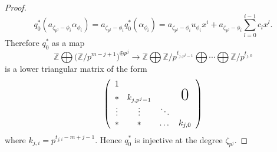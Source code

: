 \documentclass[a4paper,leqno,11pt]{amsart}
\theoremstyle{plain}
\theoremstyle{definition}
\theoremstyle{remark}
\theoremstyle{definition}
\newcommand{\Z}{{\mathbb{Z}}}
\def\Z{\mathbb{Z}}
\def\a{\alpha}
\numberwithin{equation}{section}
\begin{document}
\begin{proof}
		$$q_{0}^{*}(a_{\zeta_{p^j}-\phi_{i}}\a_{\phi_{i}})= a_{\zeta_{p^j}-\phi_{i}}q_{0}^{*}(\a_{\phi_{i}}) = a_{\zeta_{p^j}-\phi_{i}}u_{\phi_{i}}x^{i} + a_{\zeta_{p^j}-\phi_{i}}\sum_{l=0}^{i-1}c_lx^{l}. $$
		Therefore $q_{0}^{*}$ as a map  
		$$\Z\bigoplus\big(\Z/p^{m-j+1}\big)^{\oplus p^j} \to \Z\bigoplus\Z/p^{t_{j,p^j-1}}\bigoplus\cdots\bigoplus\Z/p^{t_{j,0}}$$ 
		is a lower triangular matrix of the form
		\[
		\left(
		\begin{array}{ccccc}
			1        &                          &           &  \\
			*	         & k_{j,p^j-1} &           & \text{\huge 0}\\
			\vdots	& \vdots           &    \ddots       &                \\
			*	          &  *                 & \dots  & k_{j,0}
		\end{array}
		\right)
		\]  
		where $k_{j,i}=p^{t_{j,i} - m+j-1}$. Hence $q_{0}^{*}$ is injective at the degree $\zeta_{p^j}$.
	\end{proof}
\end{document}
